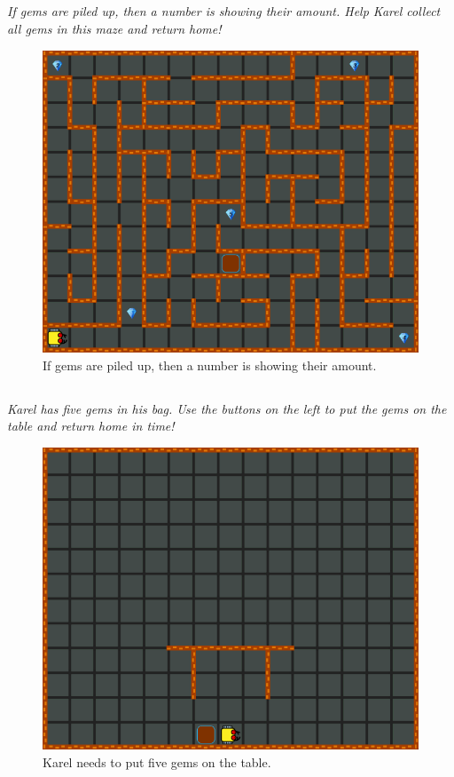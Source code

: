 \documentclass[article,A4,12pt]{llncs}
\begin{document}
\subsection{}

{\em If gems are piled up, then a number is showing their amount. 
Help Karel collect all gems in this maze and return home!}

\begin{figure}[!ht]
\begin{center}
\includegraphics[height=0.4\textwidth]{imgk/a12.png}
\end{center}
\vspace{-4mm}
\caption{If gems are piled up, then a number is showing their amount.}
\label{fig:a12}
\vspace{-10mm}
\end{figure}
\noindent

\subsection{}

{\em Karel has five gems in his bag. Use the buttons on the left to put the gems on the table and 
return home in time!}

\begin{figure}[!ht]
\begin{center}
\includegraphics[height=0.4\textwidth]{imgk/a13.png}
\end{center}
\vspace{-4mm}
\caption{Karel needs to put five gems on the table.}
\label{fig:a13}
\vspace{-4mm}
\end{figure}
\noindent
\end{document}
